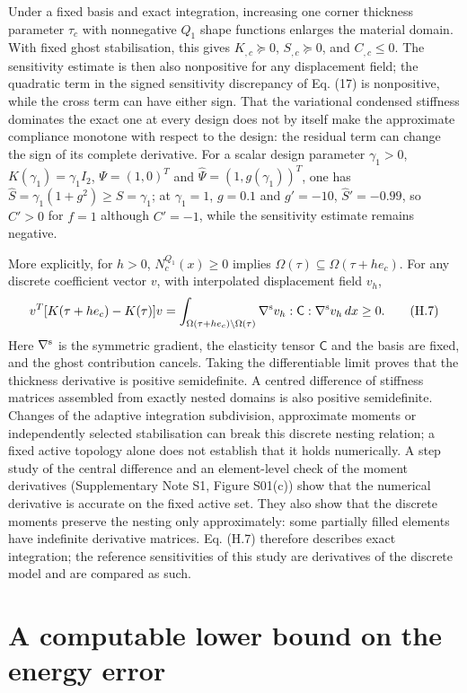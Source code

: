 \documentclass[preprint,12pt,authoryear]{elsarticle}
\begin{document}
Under a fixed basis and exact integration, increasing one corner thickness parameter \(\tau_c\) with nonnegative \(Q_1\) shape functions enlarges the material domain. With fixed ghost stabilisation, this gives \(K_{,c}\succeq0\), \(S_{,c}\succeq0\), and \(C_{,c}\le0\). The sensitivity estimate is then also nonpositive for any displacement field; the quadratic term in the signed sensitivity discrepancy of Eq. (17) is nonpositive, while the cross term can have either sign. That the variational condensed stiffness dominates the exact one at every design does not by itself make the approximate compliance monotone with respect to the design: the residual term can change the sign of its complete derivative. For a scalar design parameter \(\gamma_1>0\), \(K(\gamma_1)=\gamma_1I_2\), \(\Psi=(1,0)^T\) and \(\widehat\Psi=(1,g(\gamma_1))^T\), one has \(\widehat S=\gamma_1(1+g^2)\ge S=\gamma_1\); at \(\gamma_1=1\), \(g=0.1\) and \(g'=-10\), \(\widehat S'=-0.99\), so \(\widehat C'>0\) for \(f=1\) although \(C'=-1\), while the sensitivity estimate remains negative.

More explicitly, for \(h>0\), \(N_c^{Q_1}(x)\ge0\) implies \(\Omega(\tau)\subseteq\Omega(\tau+h e_c)\). For any discrete coefficient vector \(v\), with interpolated displacement field \(v_h\),
\[
v^T[K(\tau+h e_c)-K(\tau)]v
=\int_{\Omega(\tau+h e_c)\setminus\Omega(\tau)}
\nabla^{\rm s}v_h:\mathsf C:\nabla^{\rm s}v_h\,dx\ge0.
\tag{H.7}
\]
Here \(\nabla^{\rm s}\) is the symmetric gradient, the elasticity tensor \(\mathsf C\) and the basis are fixed, and the ghost contribution cancels. Taking the differentiable limit proves that the thickness derivative is positive semidefinite. A centred difference of stiffness matrices assembled from exactly nested domains is also positive semidefinite. Changes of the adaptive integration subdivision, approximate moments or independently selected stabilisation can break this discrete nesting relation; a fixed active topology alone does not establish that it holds numerically. A step study of the central difference and an element-level check of the moment derivatives (Supplementary Note S1, Figure S01(c)) show that the numerical derivative is accurate on the fixed active set. They also show that the discrete moments preserve the nesting only approximately: some partially filled elements have indefinite derivative matrices. Eq. (H.7) therefore describes exact integration; the reference sensitivities of this study are derivatives of the discrete model and are compared as such.

\section{A computable lower bound on the energy error}
\end{document}
